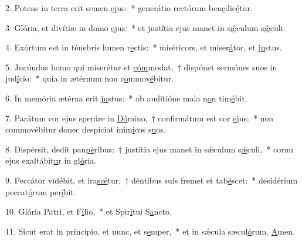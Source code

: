 2. Potens in terra erit semen \uline{e}jus:~* generátio rectórum ben\uline{e}dic\uline{é}tur.\par 
3. Glória, et divítiæ in domo \uline{e}jus:~* et justítia ejus manet in s\uline{ǽ}culum s\uline{ǽ}culi.\par 
4. Exórtum est in ténebris lumen r\uline{e}ctis:~* miséricors, et miser\uline{á}tor, et j\uline{u}stus.\par 
5. Jucúndus homo qui miserétur et \uline{cóm}modat,~† dispónet sermónes suos in jud\uline{í}cio:~* quia in ætérnum non c\uline{o}mmov\uline{é}bitur.\par 
6. In memória ætérna erit j\uline{u}stus:~* ab auditióne mala n\uline{o}n tim\uline{é}bit.\par 
7. Parátum cor ejus speráre in \uline{Dó}mino,~† confirmátum est cor \uline{e}jus:~* non commovébitur donec despíciat inim\uline{í}cos s\uline{u}os.\par 
8. Dispérsit, dedit pau\uline{pé}ribus:~† justítia ejus manet in sǽculum s\uline{ǽ}culi,~* cornu ejus exaltábit\uline{u}r in gl\uline{ó}ria.\par 
9. Peccátor vidébit, et ira\uline{scé}tur,~† déntibus suis fremet et tab\uline{é}scet:~* desidérium peccat\uline{ó}rum per\uline{í}bit.\par 
10. Glória Patri, et F\uline{í}lio,~* et Spir\uline{í}tui S\uline{a}ncto.\par 
11. Sicut erat in princípio, et nunc, et s\uline{e}mper,~* et in sǽcula sæcul\uline{ó}rum. \uline{A}men.\par 
